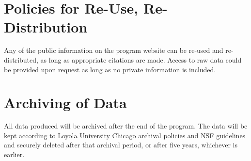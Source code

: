 \section{Policies for Re-Use, Re-Distribution}

Any of the public information on the program website can be re-used and re-distributed, as long as appropriate citations are made. Access to raw data could be provided upon request as long as no private information is included.

\section{Archiving of Data}

All data produced will be archived after the end of the program. The data will be kept according to Loyola University Chicago archival policies and NSF guidelines and securely deleted after that archival period, or after five years, whichever is earlier. %



